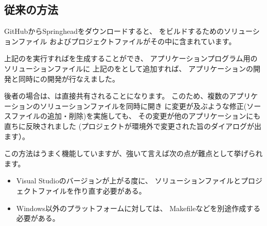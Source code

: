 \subsection{従来の方法}
\label{subsec:ConventionalMethod}

\noindent
GitHubからSpringheadをダウンロードすると、
\SprLib をビルドするためのソリューションファイル
およびプロジェクトファイルがその中に含まれています。

\medskip
\begin{narrow}
    \begin{narrow}[20pt]\begin{minipage}{\textwidth}
	{\footnotesize{}}
	\medskip
  \end{minipage}\end{narrow}
\end{narrow}

\noindent
上記の\SolutionFile を実行すれば\SprLib を生成することができ、
アプリケーションプログラム用のソリューションファイルに
上記の\ProjectFile をとして追加すれば、
アプリケーションの開発と同時に\SprLib の開発が行なえました。

後者の場合は、\ProjectFile は直接共有されることになります。
このため、複数のアプリケーションのソリューションファイルを同時に開き
\ProjectFile に変更が及ぶような修正(ソースファイルの追加・削除)を実施しても、
その変更が他のアプリケーションにも直ちに反映されました
(プロジェクトが環境外で変更された旨のダイアログが出ます）。

\noindent
\medskip
この方法はうまく機能していますが、強いて言えば次の点が難点として挙げられます。
\begin{itemize}
  \item	Visual Studioのバージョンが上がる度に、
	ソリューションファイルとプロジェクトファイルを作り直す必要がある。
  \item	Windows以外のプラットフォームに対しては、
	Makefileなどを別途作成する必要がある。
\end{itemize}

